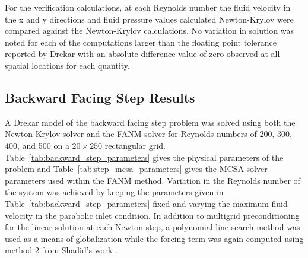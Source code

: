 For the verification calculations, at each Reynolds number the fluid
velocity in the x and y directions and fluid pressure values
calculated Newton-Krylov were compared against the Newton-Krylov
calculations. No variation in solution was noted for each of the
computations larger than the floating point tolerance reported by
Drekar with an absolute difference value of zero observed at all
spatial locations for each quantity.

\subsection{Backward Facing Step Results}
\label{subsec:backward_step_verification}

A Drekar model of the backward facing step problem was solved using
both the Newton-Krylov solver and the FANM solver for Reynolds numbers
of 200, 300, 400, and 500 on a $20 \times 250$ rectangular
grid. Table~\ref{tab:backward_step_parameters} gives the physical
parameters of the problem and Table~\ref{tab:step_mcsa_parameters}
gives the MCSA solver parameters used within the FANM
method. Variation in the Reynolds number of the system was achieved by
keeping the parameters given in
Table~\ref{tab:backward_step_parameters} fixed and varying the maximum
fluid velocity in the parabolic inlet condition. In addition to
multigrid preconditioning for the linear solution at each Newton step,
a polynomial line search method was used as a means of globalization
while the forcing term was again computed using method 2 from Shadid's
work \cite{shadid_inexact_1997}.

